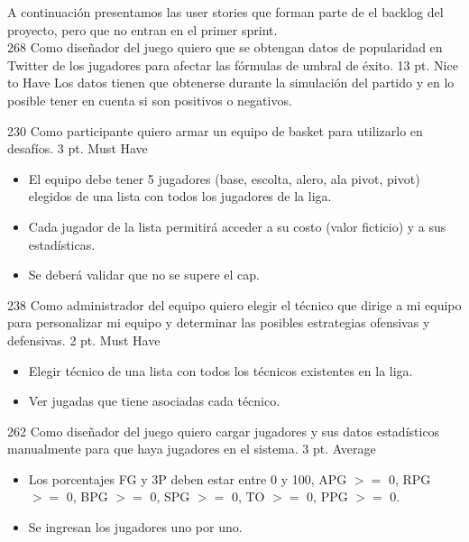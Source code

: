 A continuación presentamos las user stories que forman parte de el backlog del proyecto, pero que no entran en el primer sprint.\\

\simplestory
{268}
{Como diseñador del juego quiero que se obtengan datos de popularidad en Twitter de los jugadores para afectar las fórmulas de umbral de éxito.}
{13 pt.}
{Nice to Have}
{Los datos tienen que obtenerse durante la simulación del partido y en lo posible tener en cuenta si son positivos o negativos.}

\vspace{1cm}

\simplestory
{230}
{Como participante quiero armar un equipo de basket para utilizarlo en desafíos.}
{3 pt.}
{Must Have}
{\begin{itemize}
\item El equipo debe tener 5 jugadores (base, escolta, alero, ala pivot, pivot) elegidos de una lista con todos los jugadores de la liga.
\item Cada jugador de la lista permitirá acceder a su costo (valor ficticio) y a sus estadísticas.
\item Se deberá validar que no se supere el cap.
\end{itemize}}

\vspace{1cm}

\simplestory
{238}
{Como administrador del equipo quiero elegir el técnico que dirige a mi equipo para personalizar mi equipo y determinar las posibles estrategias ofensivas y defensivas.}
{2 pt.}
{Must Have}
{\begin{itemize}
\item Elegir técnico de una lista con todos los técnicos existentes en la liga.
\item Ver jugadas que tiene asociadas cada técnico.
\end{itemize}}

\vspace{1cm}

\simplestory
{262}
{Como diseñador del juego quiero cargar jugadores y sus datos estadísticos manualmente para que haya jugadores en el sistema.}
{3 pt.}
{Average}
{\begin{itemize}
\item Los porcentajes FG y 3P deben estar entre 0 y 100, APG $>=$ 0, RPG $>=$ 0, BPG $>=$ 0, SPG $>=$ 0, TO $>=$ 0, PPG $>=$ 0.
\item Se ingresan los jugadores uno por uno.
\end{itemize}}


